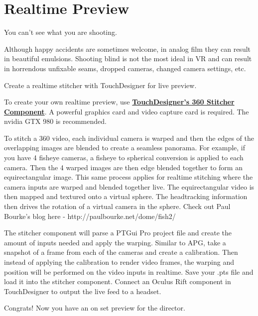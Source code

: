 \chapter{Realtime Preview}
\pagecolor{white}
\label{chap:11}
\begin{fullwidth}

\problem

{\large You can’t see what you are shooting. \par}


Although happy accidents are sometimes welcome, in analog film they can result in beautiful emulsions. Shooting blind is not the most ideal in VR and can result in horrendous unfixable seams, dropped cameras, changed camera settings, etc. 


\solution

{\large Create a realtime stitcher with TouchDesigner for live preview. \par}

To create your own realtime preview, use \textbf{\href{https://www.derivative.ca/wiki088/index.php?title=Stitcher}{TouchDesigner’s 360 Stitcher Component}}. A powerful graphics card and video capture card is required. The nvidia GTX 980 is recommended. 

To stitch a 360 video, each individual camera is warped and then the edges of the overlapping images are blended to create a seamless panorama. For example, if you have 4 fisheye cameras, a fisheye to spherical conversion is applied to each camera. Then the 4 warped images are then edge blended together to form an equirectangular image. This same process applies for realtime stitching where the camera inputs are warped and blended together live. The equirectangular video is then mapped and textured onto a virtual sphere. The headtracking information then drives the rotation of a virtual camera in the sphere. Check out Paul Bourke's blog here - http://paulbourke.net/dome/fish2/

The stitcher component will parse a PTGui Pro project file and create the amount of inputs needed and apply the warping. Similar to APG, take a snapshot of a frame from each of the cameras and create a calibration. Then instead of applying the calibration to render video frames, the warping and position will be performed on the video inputs in realtime. Save your .pts file and load it into the stitcher component. Connect an Oculus Rift component in TouchDesigner to output the live feed to a headset.

Congrats! Now you have an on set preview for the director.

\clearpage
\end{fullwidth}
